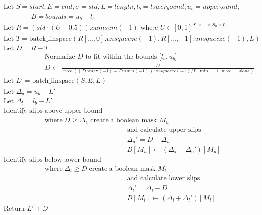 \begin{equation}
\begin{aligned}
&\text{Let } S = start, E = end, \sigma = std, L = length, l_b = lower_bound, u_b = upper_bound,\\
&\qquad\qquad B = bounds = u_b - l_b \\
&\text{Let } R = (std \cdot (U - 0.5)).cumsum(-1) \text{ where } U \in [0, 1]^{S_1 \times ... \times S_n \times L} \\
&\text{Let } T = \text{batch\_linspace}(R[..., 0].unsqueeze(-1), R[...,-1].unsqueeze(-1), L) \\
&\text{Let } D = R - T \\
&\qquad\qquad\qquad\text{Normalize } D \text{ to fit within the bounds [}l_b, u_b\text{]} \\
&\qquad\qquad\qquad D \gets \frac{D}{\max((D.\text{amax}(-1) - D.\text{amin}(-1)).unsqueeze(-1) / B, \min=1, \max=None)} \\
&\text{Let } L' = \text{batch\_linspace}(S, E, L) \\
&\text{Let } \Delta_u = u_b - L' \\
&\text{Let } \Delta_l = l_b - L' \\
&\text{Identify slips above upper bound} \\
&\qquad\qquad\qquad \text{where } D \geq \Delta_u \text{ create a boolean mask } M_u \\
&\qquad\qquad\qquad\qquad\qquad\qquad\qquad\qquad\qquad\text{and calculate upper slips} \\
&\qquad\qquad\qquad\qquad\qquad\qquad\qquad\qquad\qquad\Delta_u' = D - \Delta_u \\
&\qquad\qquad\qquad\qquad\qquad\qquad\qquad\qquad\qquad D[M_u] \gets (\Delta_u - \Delta_u')[M_u] \\
&\text{Identify slips below lower bound} \\
&\qquad\qquad\qquad \text{where } \Delta_l \geq D \text{ create a boolean mask } M_l \\
&\qquad\qquad\qquad\qquad\qquad\qquad\qquad\qquad\qquad\text{and calculate lower slips} \\
&\qquad\qquad\qquad\qquad\qquad\qquad\qquad\qquad\qquad\Delta_l' = \Delta_l - D \\
&\qquad\qquad\qquad\qquad\qquad\qquad\qquad\qquad\qquad D[M_l] \gets (\Delta_l + \Delta_l')[M_l] \\
&\text{Return } L' + D \\
\end{aligned} \label{eqn:bounded random walk}
\end{equation}